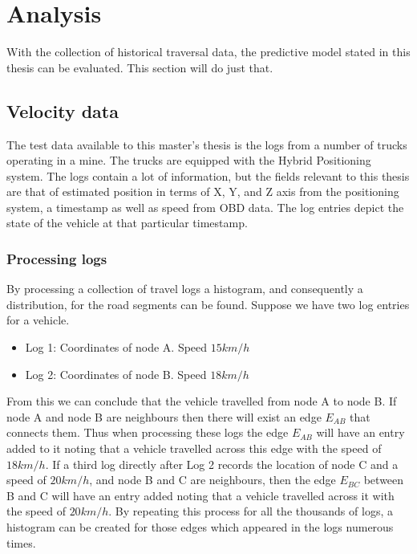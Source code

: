 \documentclass{article}
\begin{document}
    \section{Analysis}
		With the collection of historical traversal data, the predictive model stated in this thesis can be evaluated. This section will do just that.

		\subsection{Velocity data}
			The test data available to this master's thesis is the logs from a number of trucks operating in a mine. The trucks are equipped with the Hybrid Positioning system. The logs contain a lot of information, but the fields relevant to this thesis are that of estimated position in terms of X, Y, and Z axis from the positioning system, a timestamp as well as speed from OBD data. The log entries depict the state of the vehicle at that particular timestamp.

			\subsubsection{Processing logs}
				By processing a collection of travel logs a histogram, and consequently a distribution, for the road segments can be found. Suppose we have two log entries for a vehicle.
				\begin{itemize}
					\item Log 1: Coordinates of node A. Speed $15 km/h$
					\item Log 2: Coordinates of node B. Speed $18 km/h$
				\end{itemize}

				From this we can conclude that the vehicle travelled from node A to node B. If node A and node B are neighbours then there will exist an edge $E_{AB}$ that connects them. Thus when processing these logs the edge $E_{AB}$ will have an entry added to it noting that a vehicle travelled across this edge with the speed of $18 km/h$. If a third log directly after Log 2 records the location of node C and a speed of $20 km/h$, and node B and C are neighbours, then the edge $E_{BC}$ between B and C will have an entry added noting that a vehicle travelled across it with the speed of $20 km/h$. By repeating this process for all the thousands of logs, a histogram can be created for those edges which appeared in the logs numerous times.
\end{document}
